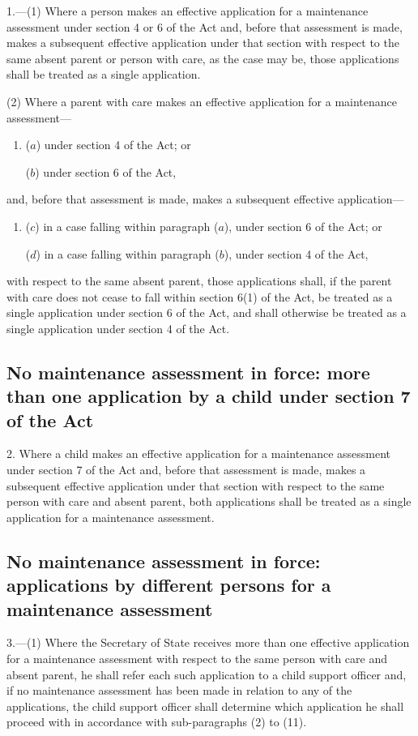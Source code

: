 \documentclass[a4paper]{article}
\begin{document}
1.—(1) Where a person makes an effective application for a maintenance assessment under section 4 or 6 of the Act and, before that assessment is made, makes a subsequent effective application under that section with respect to the same absent parent or person with care, as the case may be, those applications shall be treated as a single application.

(2) Where a parent with care makes an effective application for a maintenance assessment—
\begin{enumerate}\item[]
($a$) under section 4 of the Act; or

($b$) under section 6 of the Act,
\end{enumerate}
and, before that assessment is made, makes a subsequent effective application—
\begin{enumerate}\item[]
($c$) in a case falling within paragraph ($a$), under section 6 of the Act; or

($d$) in a case falling within paragraph ($b$), under section 4 of the Act,
\end{enumerate}
with respect to the same absent parent, those applications shall, if the parent with care does not cease to fall within section 6(1) of the Act, be treated as a single application under section 6 of the Act, and shall otherwise be treated as a single application under section 4 of the Act.

\subsection*{No maintenance assessment in force: more than one application by a child under section 7 of the Act}

2.  Where a child makes an effective application for a maintenance assessment under section 7 of the Act and, before that assessment is made, makes a subsequent effective application under that section with respect to the same person with care and absent parent, both applications shall be treated as a single application for a maintenance assessment.

\subsection*{No maintenance assessment in force: applications by different persons for a maintenance assessment}

3.—(1) Where the Secretary of State receives more than one effective application for a maintenance assessment with respect to the same person with care and absent parent, he shall refer each such application to a child support officer and, if no maintenance assessment has been made in relation to any of the applications, the child support officer shall determine which application he shall proceed with in accordance with sub-paragraphs (2) to (11).
\end{document}
